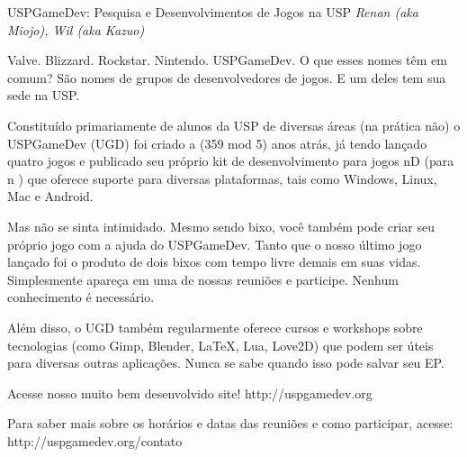 \begin{secao}{USPGameDev: Pesquisa e Desenvolvimentos de Jogos na USP}
{\em Renan (aka Miojo), Wil (aka Kazuo)}

Valve. Blizzard. Rockstar. Nintendo. USPGameDev. O que esses nomes têm em comum?
São nomes de grupos de desenvolvedores de jogos. E um deles tem sua sede na USP.

Constituído primariamente de alunos da USP de diversas áreas (na prática não) o 
USPGameDev (UGD) foi criado a (359 mod 5) anos atrás, já tendo lançado quatro jogos e 
publicado seu próprio kit de desenvolvimento para jogos nD (para n ) que 
oferece suporte para diversas plataformas, tais como Windows, Linux, Mac e Android. 

Mas não se sinta intimidado. Mesmo sendo bixo, você também pode criar seu
próprio jogo com a ajuda do USPGameDev. Tanto que o nosso último jogo lançado
foi o produto de dois bixos com tempo livre demais em suas vidas. Simplesmente
apareça em uma de nossas reuniões e participe. Nenhum conhecimento é necessário.

Além disso, o UGD também regularmente oferece cursos e workshops sobre tecnologias
(como Gimp, Blender, LaTeX, Lua, Love2D) que podem ser úteis para
diversas outras aplicações. Nunca se sabe quando isso pode
salvar seu EP.

Acesse nosso muito bem desenvolvido site! 
http://uspgamedev.org

Para saber mais sobre os horários e datas das reuniões e como participar, acesse:
http://uspgamedev.org/contato


\end{secao}



